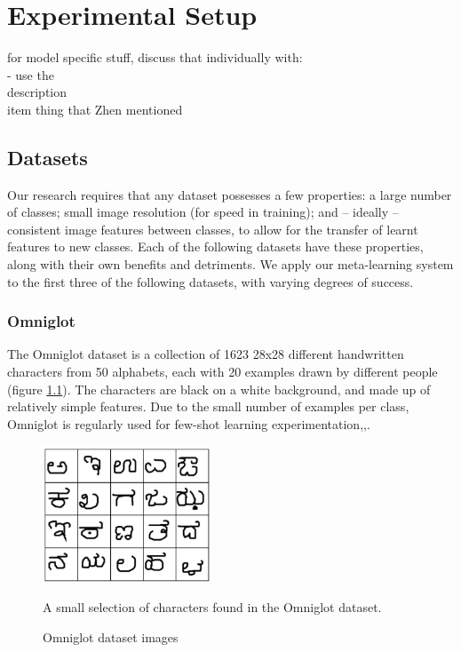 \documentclass{report}
\begin{document}
\chapter{Experimental Setup}
for model specific stuff, discuss that individually with: \\
- use the \\description{\\item{}} thing that Zhen mentioned \\

\section{Datasets} \label{datasets}
Our research requires that any dataset possesses a few properties: a large number of classes; small image resolution (for speed in training); and -- ideally -- consistent image features between classes, to allow for the transfer of learnt features to new classes. Each of the following datasets have these properties, along with their own benefits and detriments. We apply our meta-learning system to the first three of the following datasets, with varying degrees of success. \par

\subsection{Omniglot}
The Omniglot\parencite{omniglot} dataset is a collection of 1623 28x28 different handwritten characters from 50 alphabets, each with 20 examples drawn by different people (figure \ref{fig:omniglot:1}). The characters are black on a white background, and made up of relatively simple features. Due to the small number of examples per class, Omniglot is regularly used for few-shot learning experimentation\parencite{mlwtc},\parencite{matching},\parencite{prototypical}.

\begin{figure}[h]
	\centering
	\includegraphics[width=5cm]{omniglot}
	\caption{Omniglot dataset images}
	A small selection of characters found in the Omniglot dataset.
	\label{fig:omniglot:1}
\end{figure}
\end{document}
